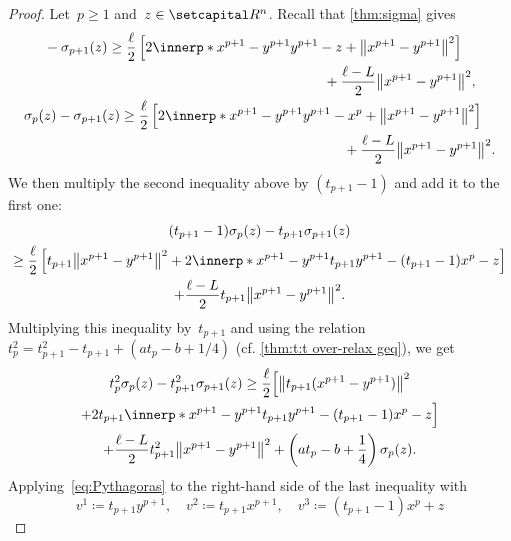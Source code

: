 \documentclass[../main]{subfiles}
\begin{document}
\begin{proof}
    Let~$p \ge 1$ and~$z \in \setR^n$.
    Recall that \cref{thm:sigma} gives
    \begin{gather}
        \begin{multlined}
        - \sigma_{p + 1}(z) \ge \frac{\ell}{2} \left[ 2 \innerp*{x^{p + 1} - y^{p + 1}}{y^{p + 1} - z} + \norm*{x^{p + 1} - y^{p + 1}}^2 \right] \\
        + \frac{\ell - L}{2} \norm*{x^{p + 1} - y^{p + 1}}^2,
        \end{multlined} \\
        \begin{multlined}
            \sigma_p(z) - \sigma_{p + 1}(z) \ge \frac{\ell}{2} \left[ 2 \innerp*{x^{p + 1} - y^{p + 1}}{y^{p + 1} - x^p} + \norm*{x^{p + 1} - y^{p + 1}}^2 \right] \\
            + \frac{\ell - L}{2} \norm*{x^{p + 1} - y^{p + 1}}^2
        .\end{multlined}
        \end{gather}
        We then multiply the second inequality above by $(t_{p + 1} - 1)$ and add it to the first one:
    \begin{multline}
        (t_{p + 1} - 1) \sigma_p(z) - t_{p + 1} \sigma_{p + 1}(z) \\
        \ge \frac{\ell}{2} \left[ t_{p + 1} \norm*{x^{p + 1} - y^{p + 1}}^2 + 2 \innerp*{x^{p + 1} - y^{p + 1}}{t_{p + 1} y^{p + 1} - (t_{p + 1} - 1)x^p - z} \right] \\
        + \frac{\ell - L}{2} t_{p + 1} \norm*{x^{p + 1} - y^{p + 1}}^2
    .\end{multline}
    Multiplying this inequality by~$t_{p + 1}$ and using the relation~$t_p^2 = t_{p + 1}^2 - t_{p + 1} + (a t_p - b + 1/4)$ (cf. \cref{thm:t:t over-relax geq}), we get
    \begin{multline}
        t_p^2 \sigma_p(z) - t_{p + 1}^2 \sigma_{p + 1}(z) \ge \frac{\ell}{2} \Bigl[ \norm*{t_{p + 1} (x^{p + 1} - y^{p + 1})}^2  \\
        + 2 t_{p + 1} \innerp*{x^{p + 1} - y^{p + 1}}{t_{p + 1} y^{p + 1} - (t_{p + 1} - 1)x^p - z} \Bigr] \\
        + \frac{\ell - L}{2} t_{p + 1}^2 \norm*{x^{p + 1} - y^{p + 1}}^2 + \left( a t_p - b + \frac{1}{4} \right) \sigma_p(z)
    .\end{multline}
    Applying~\cref{eq:Pythagoras} to the right-hand side of the last inequality with
    \[
        v^1 \coloneqq t_{p + 1} y^{p + 1}, \quad v^2 \coloneqq t_{p + 1} x^{p + 1}, \quad v^3 \coloneqq (t_{p + 1} - 1) x^p + z
\]
\end{proof}
\end{document}

